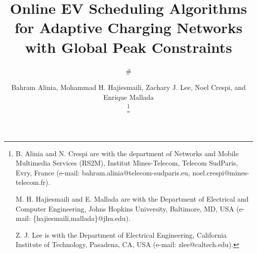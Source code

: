 \documentclass[journal]{IEEEtran}
\makeatletter
\newcommand\semiHuge{\@setfontsize\semiHuge{22.52}{27.38}}
\makeatother
\begin{document}
	\title{Online EV Scheduling Algorithms for Adaptive Charging Networks with Global Peak Constraints}
	\author{\#}
	
	\author{Bahram Alinia, Mohammad H. Hajiesmaili, Zachary J. Lee, Noel Crespi, and Enrique Mallada
		
		\thanks{ B. Alinia and N. Crespi are with the department of Networks and Mobile Multimedia Services (RS2M), Institut Mines-Telecom,
			Telecom SudParis, Evry, France (e-mail: bahram.alinia@telecom-sudparis.eu, noel.crespi@mines-telecom.fr).
			
			M. H. Hajiesmaili and E. Mallada are with the Department of Electrical and Computer Engineering, Johns Hopkins University, Baltimore, MD, USA (e-mail: \{hajiesmaili,mallada\}@jhu.edu).

			Z. J. Lee is with the Department of Electrical Engineering, California Institute of Technology, Pasadena, CA, USA (e-mail: zlee@caltech.edu).
		} }
		
		\maketitle
\end{document}

